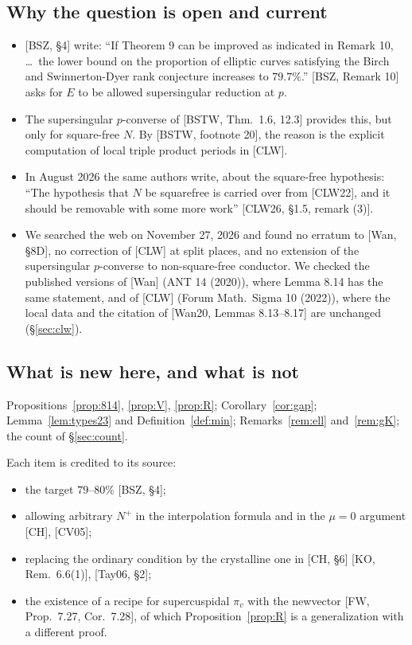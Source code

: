 \documentclass[11pt]{amsart}
\theoremstyle{definition}
\theoremstyle{remark}
\begin{document}
\subsection{Why the question is open and current}
\begin{itemize}
\item {[BSZ, \S4]} write: ``If Theorem 9 can be improved as indicated in Remark 10, \dots\ the lower bound on the proportion of elliptic curves satisfying the Birch and Swinnerton-Dyer rank conjecture increases to $79.7\%$.'' [BSZ, Remark 10] asks for $E$ to be allowed supersingular reduction at $p$.
\item The supersingular $p$-converse of [BSTW, Thm.~1.6, 12.3] provides this, but only for square-free $N$. By [BSTW, footnote 20], the reason is the explicit computation of local triple product periods in [CLW].
\item In August 2026 the same authors write, about the square-free hypothesis: ``The hypothesis that $N$ be squarefree is carried over from [CLW22], and it should be removable with some more work'' [CLW26, \S1.5, remark (3)].
\item We searched the web on November 27, 2026 and found no erratum to [Wan, \S8D], no correction of [CLW] at split places, and no extension of the supersingular $p$-converse to non-square-free conductor. We checked the published versions of [Wan] (ANT 14 (2020)), where Lemma 8.14 has the same statement, and of [CLW] (Forum Math.\ Sigma 10 (2022)), where the local data and the citation of [Wan20, Lemmas 8.13--8.17] are unchanged (\S\ref{sec:clw}).
\end{itemize}

\subsection{What is new here, and what is not}
\begin{description}[font=\normalfont\itshape]
\item[New] Propositions~\ref{prop:814}, \ref{prop:V}, \ref{prop:R}; Corollary~\ref{cor:gap}; Lemma~\ref{lem:types23} and Definition~\ref{def:min}; Remarks~\ref{rem:ell} and~\ref{rem:gK}; the count of \S\ref{sec:count}.
\item[Not new] Each item is credited to its source:
\begin{itemize}
\item the target $79$--$80\%$ [BSZ, \S4];
\item allowing arbitrary $N^+$ in the interpolation formula and in the $\mu=0$ argument [CH], [CV05];
\item replacing the ordinary condition by the crystalline one in [CH, \S6] [KO, Rem.~6.6(1)], [Tay06, \S2];
\item the existence of a recipe for supercuspidal $\pi_v$ with the newvector [FW, Prop.~7.27, Cor.~7.28], of which Proposition~\ref{prop:R} is a generalization with a different proof.
\end{itemize}
\end{description}
\end{document}
